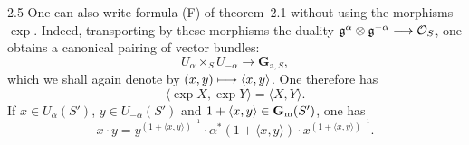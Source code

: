 \begin{remark}{2.5}\label{XX.2.5}
One can also write formula (F) of theorem~2.1 without using the morphisms $\exp$. Indeed, transporting by these morphisms the duality $\mathfrak g^\alpha\otimes\mathfrak g^{-\alpha}\longrightarrow\mathcal{O}_S$, one obtains a canonical pairing of vector bundles:
\[
U_\alpha\times_SU_{-\alpha}\to\mathbf G_{\mathrm a,S},
\]
which we shall again denote by $(x,y)\longmapsto\langle x,y\rangle$. One therefore has
\[
\langle\exp X,\exp Y\rangle=\langle X,Y\rangle.
\]
If $x\in U_\alpha(S')$, $y\in U_{-\alpha}(S')$ and $1+\langle x,y\rangle\in\mathbf{G}_{\mathrm{m}}(S')$, one has
\begin{equation}\tag{F}\label{XX.eq.Fvector}
x\cdot y=y^{(1+\langle x,y\rangle)^{-1}}\cdot\alpha^*(1+\langle x,y\rangle)\cdot x^{(1+\langle x,y\rangle)^{-1}}.
\end{equation}
\end{remark}

